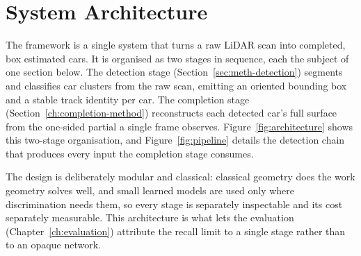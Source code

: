 \documentclass[a4paper,12pt]{report}
\begin{document}
\section{System Architecture}
\label{sec:meth-architecture}

The framework is a single system that turns a raw LiDAR scan into completed,
box estimated cars. It is organised as two stages in sequence, each the subject of one
section below. The detection stage (Section~\ref{sec:meth-detection}) segments and
classifies car clusters from the raw scan, emitting an oriented bounding box and a stable
track identity per car. The completion stage (Section~\ref{ch:completion-method})
reconstructs each detected car's full surface from the one-sided partial a single frame
observes. Figure~\ref{fig:architecture} shows this two-stage organisation, and
Figure~\ref{fig:pipeline} details the detection chain that produces every input the
completion stage consumes.

The design is deliberately modular and classical: classical geometry does the work
geometry solves well, and small learned models are used only where discrimination
needs them, so every stage is separately inspectable and its cost separately
measurable. This architecture is what lets the evaluation
(Chapter~\ref{ch:evaluation}) attribute the recall limit to a single stage rather than
to an opaque network.
\end{document}
